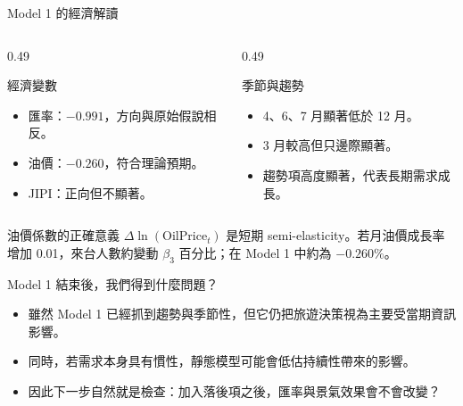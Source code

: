 \documentclass[aspectratio=169]{ctexbeamer}
\begin{document}
\begin{frame}{Model 1 的經濟解讀}
\begin{columns}[T]
  \begin{column}{0.49\textwidth}
    \begin{block}{經濟變數}
    \begin{itemize}
      \item 匯率：$-0.991$，方向與原始假說相反。
      \item 油價：$-0.260$，符合理論預期。
      \item JIPI：正向但不顯著。
    \end{itemize}
    \end{block}
  \end{column}
  \begin{column}{0.49\textwidth}
    \begin{block}{季節與趨勢}
    \begin{itemize}
      \item 4、6、7 月顯著低於 12 月。
      \item 3 月較高但只邊際顯著。
      \item 趨勢項高度顯著，代表長期需求成長。
    \end{itemize}
    \end{block}
  \end{column}
\end{columns}
\vspace{0.5em}
\begin{block}{油價係數的正確意義}
$\Delta \ln(\mathrm{OilPrice}_t)$ 是短期 semi-elasticity。若月油價成長率增加 0.01，來台人數約變動 $\beta_3$ 百分比；在 Model 1 中約為 $-0.260\%$。
\end{block}
\end{frame}

\begin{frame}{Model 1 結束後，我們得到什麼問題？}
\begin{itemize}
  \item 雖然 Model 1 已經抓到趨勢與季節性，但它仍把旅遊決策視為主要受當期資訊影響。
  \item 同時，若需求本身具有慣性，靜態模型可能會低估持續性帶來的影響。
  \item 因此下一步自然就是檢查：加入落後項之後，匯率與景氣效果會不會改變？
\end{itemize}
\end{frame}
\end{document}
